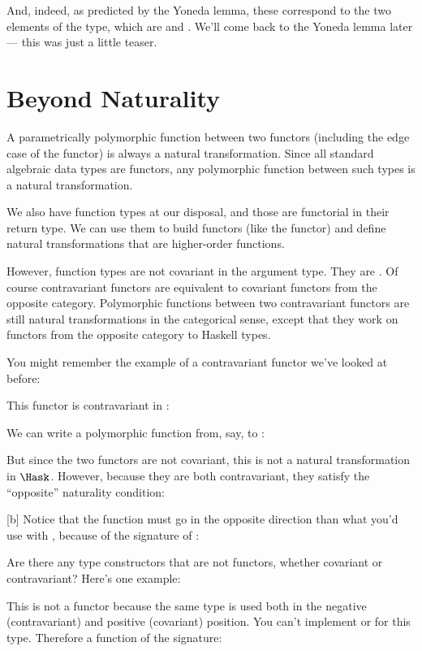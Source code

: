 And, indeed, as predicted by the Yoneda lemma, these correspond to the
two elements of the  type, which are 
and . We'll come back to the Yoneda lemma later ---
this was just a little teaser.

\section{Beyond Naturality}

A parametrically polymorphic function between two functors (including
the edge case of the  functor) is always a natural
transformation. Since all standard algebraic data types are functors,
any polymorphic function between such types is a natural transformation.

We also have function types at our disposal, and those are functorial in
their return type. We can use them to build functors (like the
 functor) and define natural transformations that are
higher-order functions.

However, function types are not covariant in the argument type. They are
. Of course contravariant functors are equivalent to
covariant functors from the opposite category. Polymorphic functions
between two contravariant functors are still natural transformations in
the categorical sense, except that they work on functors from the
opposite category to Haskell types.

You might remember the example of a contravariant functor we've looked
at before:

This functor is contravariant in :

We can write a polymorphic function from, say,  to
:

But since the two functors are not covariant, this is not a natural
transformation in $\Hask$. However, because they are both
contravariant, they satisfy the ``opposite'' naturality condition:

[b]
Notice that the function  must go in the opposite direction
than what you'd use with , because of the signature of
:

Are there any type constructors that are not functors, whether covariant
or contravariant? Here's one example:

This is not a functor because the same type  is used both in
the negative (contravariant) and positive (covariant) position. You
can't implement  or  for this type.
Therefore a function of the signature:

